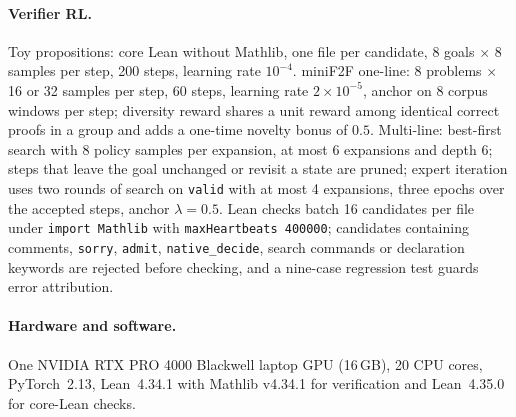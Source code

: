 \documentclass[11pt]{article}
\theoremstyle{definition}
\begin{document}
\paragraph{Verifier RL.} Toy propositions: core Lean without Mathlib, one file per candidate, 8 goals $\times$ 8 samples per step, 200 steps, learning rate $10^{-4}$. miniF2F one-line: 8 problems $\times$ 16 or 32 samples per step, 60 steps, learning rate $2\times10^{-5}$, anchor on 8 corpus windows per step; diversity reward shares a unit reward among identical correct proofs in a group and adds a one-time novelty bonus of $0.5$. Multi-line: best-first search with 8 policy samples per expansion, at most 6 expansions and depth 6; steps that leave the goal unchanged or revisit a state are pruned; expert iteration uses two rounds of search on \texttt{valid} with at most 4 expansions, three epochs over the accepted steps, anchor $\lambda=0.5$. Lean checks batch 16 candidates per file under \texttt{import Mathlib} with \texttt{maxHeartbeats 400000}; candidates containing comments, \texttt{sorry}, \texttt{admit}, \texttt{native\_decide}, search commands or declaration keywords are rejected before checking, and a nine-case regression test guards error attribution.

\paragraph{Hardware and software.} One NVIDIA RTX PRO 4000 Blackwell laptop GPU (16\,GB), 20 CPU cores, PyTorch~2.13, Lean~4.34.1 with Mathlib v4.34.1 for verification and Lean~4.35.0 for core-Lean checks.



\end{document}
